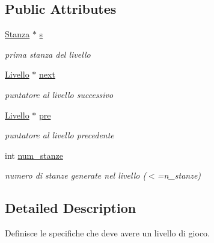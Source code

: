 \subsection*{Public Attributes}
\begin{DoxyCompactItemize}
\item 
\hypertarget{classLivello_a601562dc27ce8063d5335afe287a1301}{}\hyperlink{classStanza}{Stanza} $\ast$ \hyperlink{classLivello_a601562dc27ce8063d5335afe287a1301}{s}\label{classLivello_a601562dc27ce8063d5335afe287a1301}

\begin{DoxyCompactList}\small\item\em prima stanza del livello \end{DoxyCompactList}\item 
\hypertarget{classLivello_a787f31d6da22aeaea69f3a2a4603c918}{}\hyperlink{classLivello}{Livello} $\ast$ \hyperlink{classLivello_a787f31d6da22aeaea69f3a2a4603c918}{next}\label{classLivello_a787f31d6da22aeaea69f3a2a4603c918}

\begin{DoxyCompactList}\small\item\em puntatore al livello successivo \end{DoxyCompactList}\item 
\hypertarget{classLivello_a05397a3b59545c76f627de49f23d70a8}{}\hyperlink{classLivello}{Livello} $\ast$ \hyperlink{classLivello_a05397a3b59545c76f627de49f23d70a8}{pre}\label{classLivello_a05397a3b59545c76f627de49f23d70a8}

\begin{DoxyCompactList}\small\item\em puntatore al livello precedente \end{DoxyCompactList}\item 
\hypertarget{classLivello_a9175836818c82d7f13dd47c68f125b0d}{}int \hyperlink{classLivello_a9175836818c82d7f13dd47c68f125b0d}{num\+\_\+stanze}\label{classLivello_a9175836818c82d7f13dd47c68f125b0d}

\begin{DoxyCompactList}\small\item\em numero di stanze generate nel livello ($<$=n\+\_\+stanze) \end{DoxyCompactList}\end{DoxyCompactItemize}


\subsection{Detailed Description}
Definisce le specifiche che deve avere un livello di gioco. 

